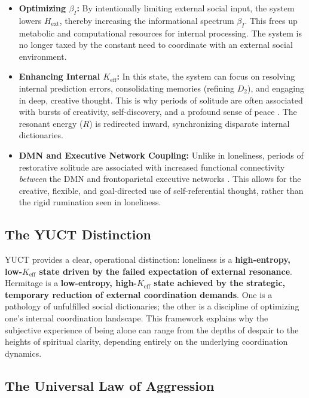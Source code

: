 \documentclass[12pt,a4paper]{article}
\begin{document}
	\begin{itemize}
		\item \textbf{Optimizing \(\beta_I\):} By intentionally limiting external social input, the system lowers \(H_{\mathrm{ext}}\), thereby increasing the informational spectrum \(\beta_I\). This frees up metabolic and computational resources for internal processing. The system is no longer taxed by the constant need to coordinate with an external social environment.
		\item \textbf{Enhancing Internal \(K_{\mathrm{eff}}\):} In this state, the system can focus on resolving internal prediction errors, consolidating memories (refining \(D_2\)), and engaging in deep, creative thought. This is why periods of solitude are often associated with bursts of creativity, self-discovery, and a profound sense of peace \cite{Nguyen2023}. The resonant energy (\(R\)) is redirected inward, synchronizing disparate internal dictionaries.
		\item \textbf{DMN and Executive Network Coupling:} Unlike in loneliness, periods of restorative solitude are associated with increased functional connectivity \textit{between} the DMN and frontoparietal executive networks \cite{Llera2024}. This allows for the creative, flexible, and goal-directed use of self-referential thought, rather than the rigid rumination seen in loneliness.
	\end{itemize}
	
	\subsection{The YUCT Distinction}
	
	YUCT provides a clear, operational distinction: loneliness is a \textbf{high-entropy, low-\(K_{\mathrm{eff}}\) state driven by the failed expectation of external resonance}. Hermitage is a \textbf{low-entropy, high-\(K_{\mathrm{eff}}\) state achieved by the strategic, temporary reduction of external coordination demands}. One is a pathology of unfulfilled social dictionaries; the other is a discipline of optimizing one's internal coordination landscape. This framework explains why the subjective experience of being alone can range from the depths of despair to the heights of spiritual clarity, depending entirely on the underlying coordination dynamics.
	
	\subsection{The Universal Law of Aggression}
	
\end{document}
